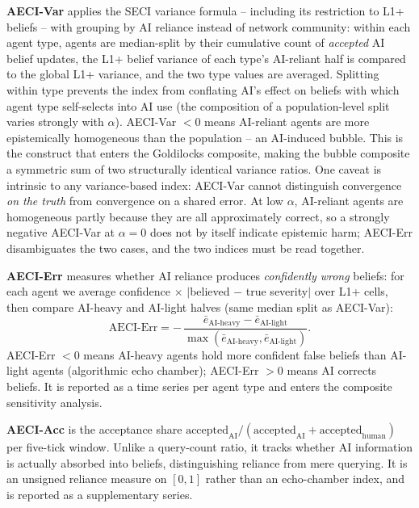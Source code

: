 \documentclass[pdflatex,sn-nature]{sn-jnl}
\begin{document}
\textbf{AECI-Var} applies the SECI variance formula -- including its restriction to L1+ beliefs -- with grouping by AI reliance instead of network community: within each agent type, agents are median-split by their cumulative count of \emph{accepted} AI belief updates, the L1+ belief variance of each type's AI-reliant half is compared to the global L1+ variance, and the two type values are averaged. Splitting within type prevents the index from conflating AI's effect on beliefs with which agent type self-selects into AI use (the composition of a population-level split varies strongly with $\alpha$). AECI-Var $< 0$ means AI-reliant agents are more epistemically homogeneous than the population -- an AI-induced bubble. This is the construct that enters the Goldilocks composite, making the bubble composite a symmetric sum of two structurally identical variance ratios. One caveat is intrinsic to any variance-based index: AECI-Var cannot distinguish convergence \emph{on the truth} from convergence on a shared error. At low $\alpha$, AI-reliant agents are homogeneous partly because they are all approximately correct, so a strongly negative AECI-Var at $\alpha = 0$ does not by itself indicate epistemic harm; AECI-Err disambiguates the two cases, and the two indices must be read together.

\textbf{AECI-Err} measures whether AI reliance produces \emph{confidently wrong} beliefs: for each agent we average confidence $\times$ $|$believed $-$ true severity$|$ over L1+ cells, then compare AI-heavy and AI-light halves (same median split as AECI-Var):
\begin{equation}
\text{AECI-Err} = -\,\frac{\bar{e}_{\text{AI-heavy}} - \bar{e}_{\text{AI-light}}}{\max(\bar{e}_{\text{AI-heavy}}, \bar{e}_{\text{AI-light}})}.
\label{eq:aecierr}
\end{equation}
AECI-Err $< 0$ means AI-heavy agents hold more confident false beliefs than AI-light agents (algorithmic echo chamber); AECI-Err $> 0$ means AI corrects beliefs. It is reported as a time series per agent type and enters the composite sensitivity analysis.

\textbf{AECI-Acc} is the acceptance share $\text{accepted}_{\text{AI}} / (\text{accepted}_{\text{AI}} + \text{accepted}_{\text{human}})$ per five-tick window. Unlike a query-count ratio, it tracks whether AI information is actually absorbed into beliefs, distinguishing reliance from mere querying. It is an unsigned reliance measure on $[0, 1]$ rather than an echo-chamber index, and is reported as a supplementary series.
\end{document}
